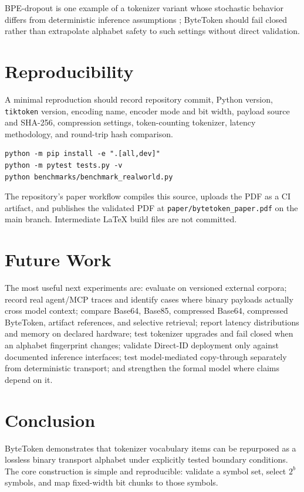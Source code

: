 \documentclass[11pt,a4paper]{article}
\begin{document}
BPE-dropout is one example of a tokenizer variant whose stochastic behavior differs from deterministic inference assumptions \cite{provilkov2020bpedropout}; ByteToken should fail closed rather than extrapolate alphabet safety to such settings without direct validation.

\section{Reproducibility}

A minimal reproduction should record repository commit, Python version, \texttt{tiktoken} version, encoding name, encoder mode and bit width, payload source and SHA-256, compression settings, token-counting tokenizer, latency methodology, and round-trip hash comparison.

\begin{verbatim}
python -m pip install -e ".[all,dev]"
python -m pytest tests.py -v
python benchmarks/benchmark_realworld.py
\end{verbatim}

The repository's paper workflow compiles this source, uploads the PDF as a CI artifact, and publishes the validated PDF at \texttt{paper/bytetoken\_paper.pdf} on the main branch. Intermediate LaTeX build files are not committed.

\section{Future Work}

The most useful next experiments are: evaluate on versioned external corpora; record real agent/MCP traces and identify cases where binary payloads actually cross model context; compare Base64, Base85, compressed Base64, compressed ByteToken, artifact references, and selective retrieval; report latency distributions and memory on declared hardware; test tokenizer upgrades and fail closed when an alphabet fingerprint changes; validate Direct-ID deployment only against documented inference interfaces; test model-mediated copy-through separately from deterministic transport; and strengthen the formal model where claims depend on it.

\section{Conclusion}

ByteToken demonstrates that tokenizer vocabulary items can be repurposed as a lossless binary transport alphabet under explicitly tested boundary conditions. The core construction is simple and reproducible: validate a symbol set, select \(2^b\) symbols, and map fixed-width bit chunks to those symbols.
\end{document}
